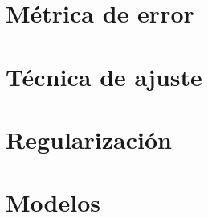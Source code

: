 \documentclass[a4paper, 20pt]{article}
\begin{document}
\section{Métrica de error}

\section{Técnica de ajuste}


\section{Regularización}

\section{Modelos}
\end{document}
